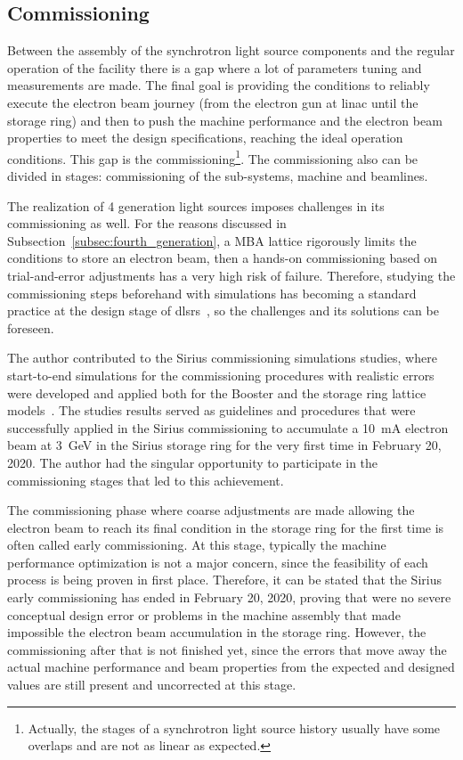 
\subsection{Commissioning}
Between the assembly of the synchrotron light source components and the regular operation of the facility there is a gap where a lot of parameters tuning and measurements are made. The final goal is providing the conditions to reliably execute the electron beam journey (from the electron gun at \gls{linac} until the storage ring) and then to push the machine performance and the electron beam properties to meet the design specifications, reaching the ideal operation conditions. This gap is the commissioning\footnote{Actually, the stages of a synchrotron light source history usually have some overlaps and are not as linear as expected.}. The commissioning also can be divided in stages: commissioning of the sub-systems, machine and beamlines.

The realization of 4 generation light sources imposes challenges in its commissioning as well. For the reasons discussed in Subsection~\ref{subsec:fourth_generation}, a MBA lattice rigorously limits the conditions to store an electron beam, then a hands-on commissioning based on trial-and-error adjustments has a very high risk of failure. Therefore, studying the commissioning steps beforehand with simulations has becoming a standard practice at the design stage of \glspl{dlsr}~\cite{sajaev2015, liuzzo2017, ghasem2019, sajaev2019, hellert2019}, so the challenges and its solutions can be foreseen. 

The author contributed to the Sirius commissioning simulations studies, where start-to-end simulations for the commissioning procedures with realistic errors were developed and applied both for the Booster and the storage ring lattice models~\cite{alves2019}. The studies results served as guidelines and procedures that were successfully applied in the Sirius commissioning to accumulate a \SI{10}{\milli\ampere} electron beam at \SI{3}{\giga\electronvolt} in the Sirius storage ring for the very first time in February 20, 2020. The author had the singular opportunity to participate in the commissioning stages that led to this achievement.

The commissioning phase where coarse adjustments are made allowing the electron beam to reach its final condition in the storage ring for the first time is often called early commissioning. At this stage, typically the machine performance optimization is not a major concern, since the feasibility of each process is being proven in first place. Therefore, it can be stated that the Sirius early commissioning has ended in February 20, 2020, proving that were no severe conceptual design error or problems in the machine assembly that made impossible the electron beam accumulation in the storage ring. However, the commissioning after that is not finished yet, since the errors that move away the actual machine performance and beam properties from the expected and designed values are still present and uncorrected at this stage.

